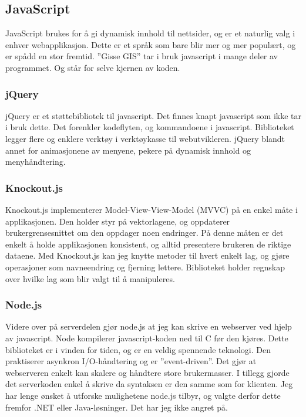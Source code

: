 \documentclass[12pt,twoside,onecolumn]{article}
\begin{document}
	\subsection{JavaScript}
	
		JavaScript brukes for å gi dynamisk innhold til nettsider, og er et naturlig valg i enhver webapplikasjon. Dette er et språk som bare blir mer og mer populært, og er spådd en stor fremtid. ''Gisse GIS'' tar i bruk javascript i mange deler av programmet. Og står for selve kjernen av koden. 
		
		\subsubsection{jQuery}
		
		jQuery er et støttebibliotek til javascript. Det finnes knapt javascript som ikke tar i bruk dette. Det forenkler kodeflyten, og kommandoene i javascript. Biblioteket legger flere og enklere verktøy i verktøykasse til webutvikleren. jQuery blandt annet for animasjonene av menyene, pekere på dynamisk innhold og menyhåndtering.
		
		\subsubsection{Knockout.js}
		
		Knockout.js implementerer Model-View-View-Model (MVVC) på en enkel måte i applikasjonen. Den holder styr på vektorlagene, og oppdaterer brukergrensesnittet om den oppdager noen endringer. På denne måten er det enkelt å holde applikasjonen konsistent, og alltid presentere brukeren de riktige dataene. Med Knockout.js kan jeg knytte metoder til hvert enkelt lag, og gjøre operasjoner som navneendring og fjerning lettere. Biblioteket holder regnskap over hvilke lag som blir valgt til å manipuleres. 
		
		\subsubsection{Node.js}
		
		Videre over på serverdelen gjør node.js at jeg kan skrive en webserver ved hjelp av javascript. Node kompilerer javascript-koden ned til C før den kjøres. Dette biblioteket er i vinden for tiden, og er en veldig spennende teknologi. Den praktiserer asynkron I/O-håndtering og er ''event-driven''. Det gjør at webserveren enkelt kan skalere og håndtere store brukermasser. I tillegg gjorde det serverkoden enkel å skrive da syntaksen er den samme som for klienten. Jeg har lenge ønsket å utforske mulighetene node.js tilbyr, og valgte derfor dette fremfor .NET eller Java-løsninger. Det har jeg ikke angret på.
		
\end{document}

